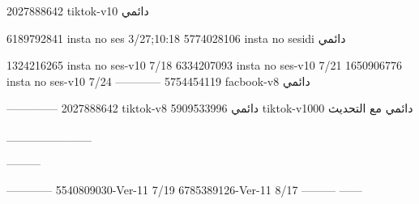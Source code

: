 2027888642 tiktok-v10
دائمي

6189792841 insta no ses
3/27;10:18
5774028106 insta no sesidi
دائمي

1324216265 insta no ses-v10
7/18
6334207093 insta no ses-v10
7/21
1650906776 insta no ses-v10
7/24
------------
5754454119 facbook-v8
دائمي


--------------
2027888642 tiktok-v8
دائمي
5909533996 tiktok-v1000
دائمي مع التحديث

__________

---------

------------
5540809030-Ver-11
7/19
6785389126-Ver-11
8/17
---------
------

